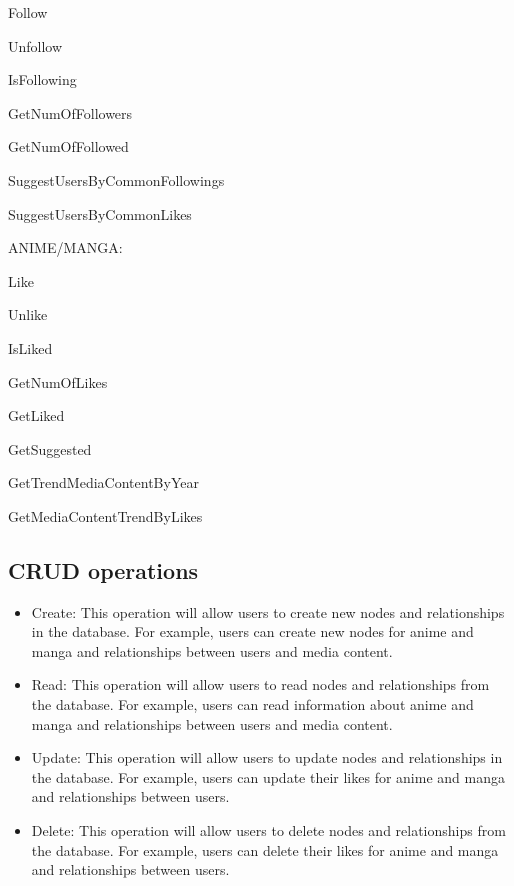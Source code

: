 Follow


Unfollow 


IsFollowing 


GetNumOfFollowers


GetNumOfFollowed


SuggestUsersByCommonFollowings


SuggestUsersByCommonLikes


ANIME/MANGA:


Like 


Unlike 


IsLiked


GetNumOfLikes


GetLiked 


GetSuggested 


GetTrendMediaContentByYear


GetMediaContentTrendByLikes


\subsection{CRUD operations}
\begin{itemize}
    \item Create: This operation will allow users to create new nodes and relationships in the database. For example, users can create new nodes for anime and manga and relationships between users and media content.
    \item Read: This operation will allow users to read nodes and relationships from the database. For example, users can read information about anime and manga and relationships between users and media content.
    \item Update: This operation will allow users to update nodes and relationships in the database. For example, users can update their likes for anime and manga and relationships between users.
    \item Delete: This operation will allow users to delete nodes and relationships from the database. For example, users can delete their likes for anime and manga and relationships between users.
\end{itemize}


